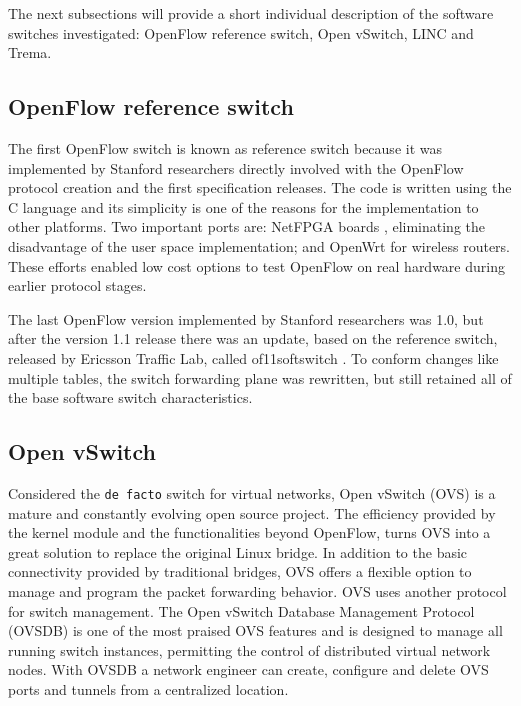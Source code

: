 The next subsections will provide a short individual description of the software switches investigated: OpenFlow reference switch, Open vSwitch, LINC and Trema. 

    \subsection{OpenFlow reference switch}
    \label{sec:sec221}
    
     The first OpenFlow switch is known as reference switch because it was implemented by Stanford researchers directly involved with the OpenFlow protocol creation and the first specification releases. The code is written using the C language and its simplicity is one of the reasons for the implementation to other platforms. Two important ports are: NetFPGA boards \cite{netpfgaof}, eliminating the disadvantage of the user space implementation; and OpenWrt \cite{pantou} for wireless routers. These efforts enabled low cost options to test OpenFlow on real hardware during earlier protocol stages.    
     
     The last OpenFlow version implemented by Stanford researchers was 1.0, but after the version 1.1 release there was an update, based on the reference switch, released by Ericsson Traffic Lab, called of11softswitch \cite{of11softswitch}. To conform changes like multiple tables, the switch forwarding plane was rewritten, but still retained all of the base software switch characteristics.     

     \subsection{Open vSwitch}
    
    Considered the \texttt{de facto} switch for virtual networks, Open vSwitch \cite{Pfaff_e.a.:extending} (OVS) is a mature and constantly evolving open source project. The efficiency provided by the kernel module and the functionalities beyond OpenFlow, turns OVS into a great solution to replace the original Linux bridge. In addition to the basic connectivity provided by traditional bridges, OVS offers a flexible option to manage and program the packet forwarding behavior. OVS uses another protocol for switch management. The Open vSwitch Database Management Protocol (OVSDB) is one of the most praised OVS features and is designed to manage all running switch instances, permitting the control of distributed virtual network nodes. With OVSDB a network engineer can create, configure and delete OVS ports and tunnels from a centralized location.

